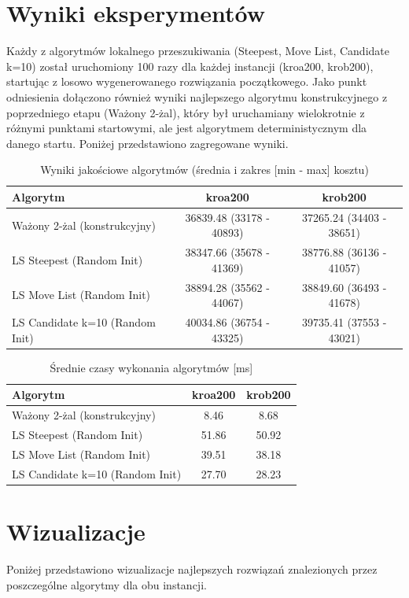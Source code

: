 \documentclass[12pt,a4paper]{article}
\begin{document}
\section{Wyniki eksperymentów}
Każdy z algorytmów lokalnego przeszukiwania (Steepest, Move List, Candidate k=10) został uruchomiony 100 razy dla każdej instancji (kroa200, krob200), startując z losowo wygenerowanego rozwiązania początkowego. Jako punkt odniesienia dołączono również wyniki najlepszego algorytmu konstrukcyjnego z poprzedniego etapu (Ważony 2-żal), który był uruchamiany wielokrotnie z różnymi punktami startowymi, ale jest algorytmem deterministycznym dla danego startu. Poniżej przedstawiono zagregowane wyniki.

\begin{table}[H]
\centering
\caption{Wyniki jakościowe algorytmów (średnia i zakres [min - max] kosztu)}
\label{tab:quality_results}
\begin{tabular}{@{}lcc@{}}
\toprule
\textbf{Algorytm} & \textbf{kroa200} & \textbf{krob200} \\
\midrule
Ważony 2-żal (konstrukcyjny) & 36839.48 (33178 - 40893) & 37265.24 (34403 - 38651) \\
LS Steepest (Random Init) & 38347.66 (35678 - 41369) & 38776.88 (36136 - 41057) \\
LS Move List (Random Init) & 38894.28 (35562 - 44067) & 38849.60 (36493 - 41678) \\
LS Candidate k=10 (Random Init) & 40034.86 (36754 - 43325) & 39735.41 (37553 - 43021) \\
\bottomrule
\end{tabular}
\end{table}

\begin{table}[H]
\centering
\caption{Średnie czasy wykonania algorytmów [ms]}
\label{tab:time_results}
\begin{tabular}{@{}lcc@{}}
\toprule
\textbf{Algorytm} & \textbf{kroa200} & \textbf{krob200} \\
\midrule
Ważony 2-żal (konstrukcyjny) & 8.46 & 8.68 \\
LS Steepest (Random Init) & 51.86 & 50.92 \\
LS Move List (Random Init) & 39.51 & 38.18 \\
LS Candidate k=10 (Random Init) & 27.70 & 28.23 \\
\bottomrule
\end{tabular}
\end{table}

\section{Wizualizacje}
Poniżej przedstawiono wizualizacje najlepszych rozwiązań znalezionych przez poszczególne algorytmy dla obu instancji.
\end{document}
